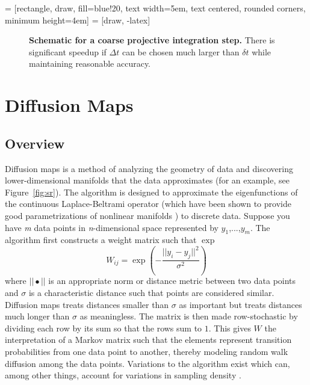 \documentclass[12pt]{article}
\begin{document}
 = [rectangle, draw, fill=blue!20, 
    text width=5em, text centered, rounded corners, minimum height=4em]
 = [draw, -latex]
\begin{figure}[h]
\caption{\textbf{Schematic for a coarse projective integration step.} There is significant speedup if $\Delta t$ can be chosen much larger than $\delta t$ while maintaining reasonable accuracy.}
\label{fig:cpi}
\end{figure}

\section{Diffusion Maps}

\subsection{Overview} \label{DMO}

Diffusion maps is a method of analyzing the geometry of data and discovering lower-dimensional manifolds that the data approximates (for an example, see Figure~\ref{fig:sr}). The algorithm is designed to approximate the eigenfunctions of the continuous Laplace-Beltrami operator (which have been shown to provide good parametrizations of nonlinear manifolds \cite{Jones2008}) to discrete data. Suppose you have \textit{m} data points in \textit{n}-dimensional space represented by $y_1$,...,$y_\textit{m}$. The algorithm first constructs a weight matrix such that $\exp$\\
\[
W_{ij}=\exp{\left(-\frac{||y_i-y_j||^2}{\sigma ^2}\right)}
\]
where $|| \bullet ||$ is an appropriate norm or distance metric between two data points and $\sigma$ is a characteristic distance such that points are considered similar. Diffusion maps treats distances smaller than $\sigma$ as important but treats distances much longer than $\sigma$ as meaningless. The matrix is then made row-stochastic by dividing each row by its sum so that the rows sum to $1$. This gives $W$ the interpretation of a Markov matrix such that the elements represent transition probabilities from one data point to another, thereby modeling random walk diffusion among the data points. Variations to the algorithm exist which can, among other things, account for variations in sampling density \cite{Coifman2006}.\vspace{1mm}
\end{document}
